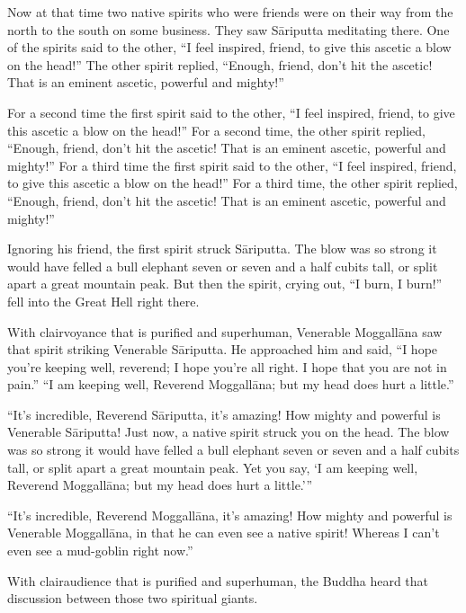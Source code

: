 \documentclass[12pt,openany]{book}%
\begin{document}
Now at that time two native spirits who were friends were on their way from the north to the south on some business. They saw \textsanskrit{Sāriputta} meditating there. One of the spirits said to the other, “I feel inspired, friend, to give this ascetic a blow on the head!” The other spirit replied, “Enough, friend, don’t hit the ascetic! That is an eminent ascetic, powerful and mighty!” 

For a second time the first spirit said to the other, “I feel inspired, friend, to give this ascetic a blow on the head!” For a second time, the other spirit replied, “Enough, friend, don’t hit the ascetic! That is an eminent ascetic, powerful and mighty!” For a third time the first spirit said to the other, “I feel inspired, friend, to give this ascetic a blow on the head!” For a third time, the other spirit replied, “Enough, friend, don’t hit the ascetic! That is an eminent ascetic, powerful and mighty!” 

Ignoring his friend, the first spirit struck \textsanskrit{Sāriputta}. The blow was so strong it would have felled a bull elephant seven or seven and a half cubits tall, or split apart a great mountain peak. But then the spirit, crying out, “I burn, I burn!” fell into the Great Hell right there. 

With clairvoyance that is purified and superhuman, Venerable \textsanskrit{Moggallāna} saw that spirit striking Venerable \textsanskrit{Sāriputta}. He approached him and said, “I hope you’re keeping well, reverend; I hope you’re all right. I hope that you are not in pain.” “I am keeping well, Reverend \textsanskrit{Moggallāna}; but my head does hurt a little.” 

“It’s incredible, Reverend \textsanskrit{Sāriputta}, it’s amazing! How mighty and powerful is Venerable \textsanskrit{Sāriputta}! Just now, a native spirit struck you on the head. The blow was so strong it would have felled a bull elephant seven or seven and a half cubits tall, or split apart a great mountain peak. Yet you say, ‘I am keeping well, Reverend \textsanskrit{Moggallāna}; but my head does hurt a little.’” 

“It’s incredible, Reverend \textsanskrit{Moggallāna}, it’s amazing! How mighty and powerful is Venerable \textsanskrit{Moggallāna}, in that he can even see a native spirit! Whereas I can’t even see a mud-goblin right now.” 

With clairaudience that is purified and superhuman, the Buddha heard that discussion between those two spiritual giants. 
\end{document}
